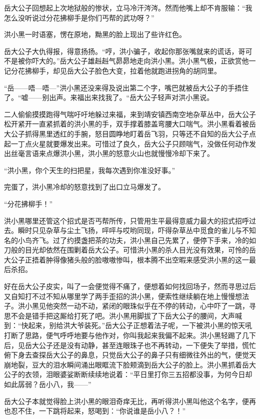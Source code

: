 岳大公子回想起上次地狱般的惨状，立马冷汗涔涔。然而他嘴上却不肯服输：“我怎么没听说过分花拂柳手是你们丐帮的武功呀？”

洪小黑一时语塞，愣在原地，黝黑的脸上现出了些许红色。

岳大公子大仇得报，得意扬扬。“哼，洪小骗子，收起你那张嘴就来的谎话，哥可不是被你吓大的。”岳大公子雄赳赳气昴昴地走向洪小黑。洪小黑气极，正欲赏他一记分花拂柳手，却见岳大公子脸色大变，拉着他就跑进拐角的胡同里。

“岳------唔---唔---”洪小黑还没来得及说出第二个字，嘴巴就被岳大公子的手捂住了。“嘘------别出声。来福出来找我了。“岳大公子轻声对洪小黑说。


\splitline

二人偷偷摸摸跑得气喘吁吁地躲过来福，来到靖安镇西南空地杂草丛中，岳大公子松开紧开一直紧抓着的洪小黑的手，双手撑着膝盖弯腰大口喘气。洪小黑看着被岳大公子抓得黑里透红的手腕，怒目圆睁地盯着岳飞羽，只等还不自知的岳大公子点起一丁点火星就要爆发出来。可惜过了良久，岳大公子只顾喘气，没做任何动作发出丝毫言语来点爆洪小黑，洪小黑的怒意火山也就慢慢冷却下来了。

“洪小黑，你个天生的扫把星，我每次遇到你准没好事。”

完蛋了，洪小黑冷却的怒意找到了出口立马爆发了。

“分花拂柳手！”

洪小黑哪里还管这个招式是否丐帮所传，只管用生平最得意威力最大的招式招呼过去。瞬时只见杂草与尘土飞扬，呯呯与哎哟同现，吓得杂草丛中觅食的雀儿与不知名的小鸟齐飞。过了约摸盏把茶的功夫，洪小黑自己先累了，便停下手来，冷的如刀般的目光却依然在围剿着岳大公子。可惜洪小黑的杀人目光没有效果，可怜的岳大公子正捂着肿得像猪头般的脸嗷嗷惨叫，根本腾不出空暇来感受洪小黑的这一最后杀招。

好在岳大公子皮实，叫了一会便觉得不痛了，便想着如何找回场子，然而寻思过后又自知打不过不知从哪里学了两手歪招的洪小黑，便索性继续躺在地上慢慢想法子。洪小黑见他突然一动不动，紧闭的眼珠似乎在不停的转动，心中吓了一跳，寻思不会是错手把这厮给打死了吧。洪小黑用脚拔了下岳大公子的腰间，大声喊到：“快起来，别给洪大爷装死。”岳大公子正想着法子呢，一下被洪小黑的惊天吼打断了思路，便气呼呼地要与他作对，你叫我起来我偏不起来。洪小黑轻踢了几下后，见岳大公子还是没有动静，甚至连眼珠子也不再转动，一下便失了举措，慌忙俯下身去查探岳大公子的鼻息，只觉岳大公子的鼻子只有细微往外出的气，便觉天崩地裂，豆大的泪水瞬间涌出眼眶流下脸颊滴到岳大公子的脸上。洪小黑抓着岳大公子的衣领，泪眼婆娑断断续续地说着：“平日里打你三五招都没事，为何今日却如此孱弱？岳小八，我------”

岳大公子本就觉得脸上洪小黑的眼泪奇痒无比，再听得洪小黑叫他这个名字，便再也忍不住，一下跳将起来，怒喝到：“你说谁是岳小八？！”


